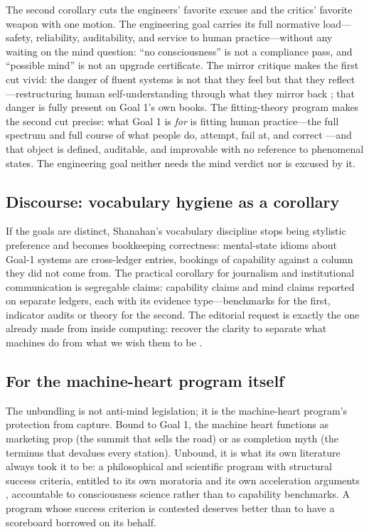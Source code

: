 \documentclass[10pt]{article}
\begin{document}
The second corollary cuts the engineers' favorite excuse and the critics' favorite weapon with one motion. The engineering goal carries its full normative load---safety, reliability, auditability, and service to human practice---without any waiting on the mind question: ``no consciousness'' is not a compliance pass, and ``possible mind'' is not an upgrade certificate. The mirror critique makes the first cut vivid: the danger of fluent systems is not that they feel but that they reflect---restructuring human self-understanding through what they mirror back \cite{vallor2024mirror}; that danger is fully present on Goal 1's own books. The fitting-theory program makes the second cut precise: what Goal 1 is \emph{for} is fitting human practice---the full spectrum and full course of what people do, attempt, fail at, and correct \cite{yu2026fitting,yu2026methodology}---and that object is defined, auditable, and improvable with no reference to phenomenal states. The engineering goal neither needs the mind verdict nor is excused by it.

\subsection{Discourse: vocabulary hygiene as a corollary}\label{sec:discourse}

If the goals are distinct, Shanahan's vocabulary discipline \cite{shanahan2024talking} stops being stylistic preference and becomes bookkeeping correctness: mental-state idioms about Goal-1 systems are cross-ledger entries, bookings of capability against a column they did not come from. The practical corollary for journalism and institutional communication is segregable claims: capability claims and mind claims reported on separate ledgers, each with its evidence type---benchmarks for the first, indicator audits or theory for the second. The editorial request is exactly the one already made from inside computing: recover the clarity to separate what machines do from what we wish them to be \cite{jorge2026harsh}.

\subsection{For the machine-heart program itself}\label{sec:mcheart}

The unbundling is not anti-mind legislation; it is the machine-heart program's protection from capture. Bound to Goal 1, the machine heart functions as marketing prop (the summit that sells the road) or as completion myth (the terminus that devalues every station). Unbound, it is what its own literature always took it to be: a philosophical and scientific program with structural success criteria, entitled to its own moratoria \cite{metzinger2021artificial} and its own acceleration arguments \cite{amcs2023letter}, accountable to consciousness science rather than to capability benchmarks. A program whose success criterion is contested deserves better than to have a scoreboard borrowed on its behalf.
\end{document}
